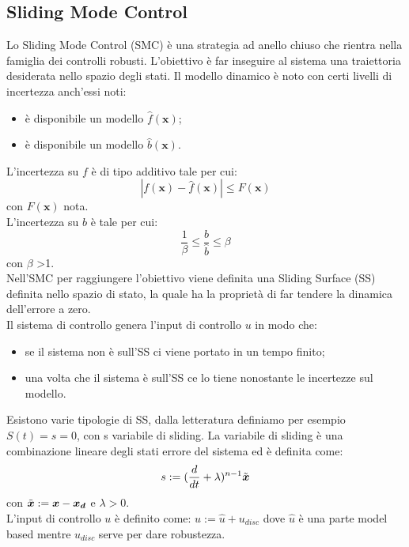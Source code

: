 \subsection{Sliding Mode Control} \label{SMC_Theory}
Lo Sliding Mode Control (SMC) \cite{SMCOriginal} è una strategia ad anello chiuso che rientra nella famiglia dei controlli robusti. L'obiettivo è far inseguire al sistema una traiettoria desiderata nello spazio degli stati. Il modello dinamico è noto con certi livelli di incertezza anch'essi noti:
\begin{itemize}
    \item è disponibile un modello $\hat{f}(\boldsymbol {x})$;
    \item è disponibile un modello $\hat{b}(\boldsymbol {x})$.
\end{itemize}
L'incertezza su $f$ è di tipo additivo tale per cui:
\begin{equation}
|f(\boldsymbol {x})-\hat{f}(\boldsymbol {x})|\leq F(\boldsymbol {x})
\end{equation}
con $F(\boldsymbol {x})$ nota. \\
L'incertezza su $b$ è tale per cui:
\begin{equation}
\frac{1}{\beta} \leq \frac{b}{\hat{b}}\leq \beta
\end{equation}
con $\beta$ >1.
\\
Nell'SMC per raggiungere l'obiettivo viene definita una Sliding Surface (SS) definita nello spazio di stato, la quale ha la proprietà di far tendere la dinamica dell'errore a zero. \\ Il sistema di controllo genera l'input di controllo $u$ in modo che:
\begin{itemize}
    \item se il sistema non è sull'SS ci viene portato in un tempo finito;
    \item una volta che il sistema è sull'SS ce lo tiene nonostante le incertezze sul modello.
\end{itemize}
Esistono varie tipologie di SS, dalla letteratura definiamo per esempio $S(t)=s=0$, con s variabile di sliding. La variabile di sliding è una combinazione lineare degli stati errore del sistema ed è definita come:
\begin{equation}
s:=(\frac{d}{dt}+\lambda)^{n-1}\Tilde{\boldsymbol {x}}
\end{equation}
con $\Tilde{\boldsymbol {x}}:=\boldsymbol {x}-\boldsymbol {x_d}$ e $\lambda>0$.
\\
L'input di controllo $u$ è definito come: $u:=\hat{u}+u_{disc}$ dove $\hat{u}$ è una parte model based mentre $u_{disc}$ serve per dare robustezza. \\
